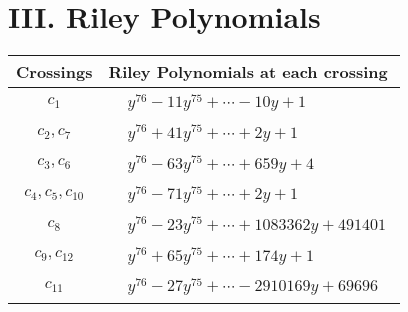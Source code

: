 \documentclass[1p]{elsarticle_modified}
\theoremstyle{definition}
\begin{document}
\centering \section*{ III. Riley Polynomials}
\begin{tabular}{m{50pt}|m{274pt}}
Crossings & \hspace{64pt}Riley Polynomials at each crossing \\
\hline $$\begin{aligned}c_{1}\end{aligned}$$&$\begin{aligned}
&y^{76}-11 y^{75}+\cdots-10 y+1
\end{aligned}$\\
\hline $$\begin{aligned}c_{2},c_{7}\end{aligned}$$&$\begin{aligned}
&y^{76}+41 y^{75}+\cdots+2 y+1
\end{aligned}$\\
\hline $$\begin{aligned}c_{3},c_{6}\end{aligned}$$&$\begin{aligned}
&y^{76}-63 y^{75}+\cdots+659 y+4
\end{aligned}$\\
\hline $$\begin{aligned}c_{4},c_{5},c_{10}\end{aligned}$$&$\begin{aligned}
&y^{76}-71 y^{75}+\cdots+2 y+1
\end{aligned}$\\
\hline $$\begin{aligned}c_{8}\end{aligned}$$&$\begin{aligned}
&y^{76}-23 y^{75}+\cdots+1083362 y+491401
\end{aligned}$\\
\hline $$\begin{aligned}c_{9},c_{12}\end{aligned}$$&$\begin{aligned}
&y^{76}+65 y^{75}+\cdots+174 y+1
\end{aligned}$\\
\hline $$\begin{aligned}c_{11}\end{aligned}$$&$\begin{aligned}
&y^{76}-27 y^{75}+\cdots-2910169 y+69696
\end{aligned}$\\
\hline
\end{tabular}
\vskip 2pc
\end{document}
